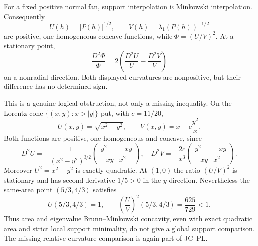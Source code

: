 \begin{remark}
For a fixed positive normal fan, support interpolation is Minkowski
interpolation.  Consequently
\[
 U(h)=|P(h)|^{1/2},
 \qquad V(h)=\lambda_1(P(h))^{-1/2}
\]
are positive, one-homogeneous concave functions, while
$\Phi=(U/V)^2$.  At a stationary point,
\[
 \frac{D^2\Phi}{\Phi}
 =2\left(\frac{D^2U}{U}-\frac{D^2V}{V}\right)
\]
on a nonradial direction.  Both displayed curvatures are nonpositive,
but their difference has no determined sign.

This is a genuine logical obstruction, not only a missing inequality.
On the Lorentz cone $\{(x,y):x>|y|\}$ put, with $c=11/20$,
\[
 U(x,y)=\sqrt{x^2-y^2},
 \qquad V(x,y)=x-c\frac{y^2}{x}.
\]
Both functions are positive, one-homogeneous and concave, since
\[
 D^2U=-\frac1{(x^2-y^2)^{3/2}}
 \begin{pmatrix}y^2&-xy\\-xy&x^2\end{pmatrix},
 \quad
 D^2V=-\frac{2c}{x^3}
 \begin{pmatrix}y^2&-xy\\-xy&x^2\end{pmatrix}.
\]
Moreover $U^2=x^2-y^2$ is exactly quadratic.  At $(1,0)$ the ratio
$(U/V)^2$ is stationary and has second derivative $1/5>0$ in the
$y$ direction.  Nevertheless the same-area point $(5/3,4/3)$ satisfies
\[
 U(5/3,4/3)=1,
 \qquad
 \left(\frac UV\right)^2(5/3,4/3)=\frac{625}{729}<1.
\]
Thus area and eigenvalue Brunn--Minkowski concavity, even with exact
quadratic area and strict local support minimality, do not give a global
support comparison.  The missing relative curvature comparison is again
part of JC--PL.
\end{remark}

